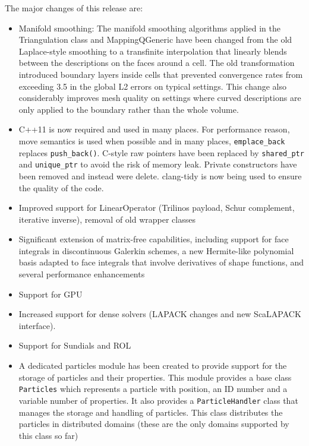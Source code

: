 \documentclass{ansarticle-preprint}
\begin{document}
The major changes of this release are:
\begin{itemize}
\item
  Manifold smoothing: The manifold smoothing algorithms applied in the
  Triangulation class and MappingQGeneric have been changed from the old
  Laplace-style smoothing to a transfinite interpolation that linearly
  blends between the descriptions on the faces around a cell. The old
  transformation introduced boundary layers inside cells that prevented
  convergence rates from exceeding 3.5 in the global L2 errors on typical
  settings. This change also considerably improves mesh quality on settings
  where curved descriptions are only applied to the boundary rather than
  the whole volume.

\item
  C++11 is now required and used in many places. For performance reason,
  move semantics is used when possible and in many places, \texttt{emplace\_back} 
  replaces \texttt{push\_back()}. C-style raw pointers have been replaced by
  \texttt{shared\_ptr} and \texttt{unique\_ptr} to avoid the risk of memory leak.
  Private constructors have been removed and instead were delete. clang-tidy is
  now being used to ensure the quality of the code.

\item
  Improved support for LinearOperator (Trilinos payload, Schur complement,
  iterative inverse), removal of old wrapper classes

\item
  Significant extension of matrix-free capabilities, including support for face integrals in discontinuous Galerkin schemes, a new Hermite-like polynomial basis adapted to face integrals that involve derivatives of shape functions, and several performance enhancements

\item
  Support for GPU

\item
  Increased support for dense solvers (LAPACK changes and new ScaLAPACK
  interface).

\item
  Support for Sundials and ROL

\item
  A dedicated particles module has been created to provide support for the
  storage of particles and their properties. This module provides a base class
  \texttt{Particles} which represents a particle with position, an ID number and
  a variable number of properties. It also provides a \texttt{ParticleHandler}
  class that manages the storage and handling of particles. This class
  distributes the particles in distributed domains (these are the only domains
  supported by this class so far)


\end{itemize}
\end{document}
